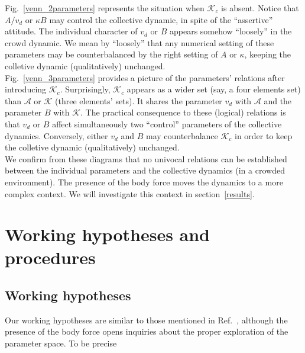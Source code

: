 \documentclass[preprint,12pt]{elsarticle}
\begin{document}
Fig.~\ref{venn_2parameters} represents the situation when $\mathcal{K}_c$ is 
absent. Notice that $A/v_d$ or $\kappa B$ may control the collective 
dynamic, in spite of the ``assertive'' attitude. The individual character of 
$v_d$ or $B$ appears somehow ``loosely'' in the crowd dynamic. We mean by 
``loosely'' that any numerical setting of these parameters may be 
counterbalanced by the right setting of $A$ or $\kappa$, keeping the 
colletive dynamic (qualitatively) unchanged.  \\

Fig.~\ref{venn_3parameters} provides a picture of the parameters' relations 
after introducing $\mathcal{K}_c$. Surprisingly, $\mathcal{K}_c$ appears as a
wider set (say, a four elements set) than $\mathcal{A}$ or $\mathcal{K}$ (three 
elements' sets). It shares the parameter $v_d$ with $\mathcal{A}$ and the 
parameter $B$ with $\mathcal{K}$. The practical consequence to these (logical)
relations is that $v_d$ or $B$ affect simultaneously two ``control'' parameters 
of the collective dynamics. Conversely, either $v_d$ and $B$ may counterbalance 
$\mathcal{K}_c$ in order to keep the colletive dynamic (qualitatively) 
unchanged.  \\

We confirm from these diagrams that no univocal relations can be established 
between the individual parameters and the collective dynamics (in a crowded 
environment). The presence of the body force moves the dynamics to a more 
complex context. We will investigate this context in section~\ref{results}. \\



\section{\label{hypotheses}Working hypotheses and procedures}


\subsection{Working hypotheses}

Our working hypotheses are similar to those mentioned in 
Ref.~\cite{dorso_2019}, 
although the presence of the body force opens inquiries about the proper 
exploration of the parameter space. To be precise
\end{document}
